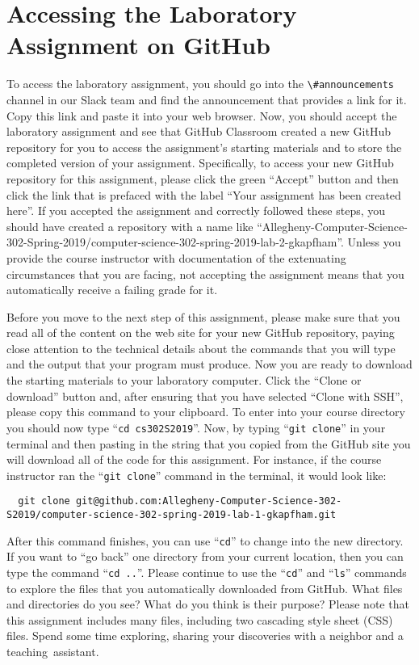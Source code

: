 \documentclass[11pt]{article}
\newcommand{\command}[1]{``\lstinline{#1}''}
\newcommand{\channel}[1]{\lstinline{#1}}
\newcommand{\step}[1]{``{#1}''}
\begin{document}
\section*{Accessing the Laboratory Assignment on GitHub}

To access the laboratory assignment, you should go into the
\channel{\#announcements} channel in our Slack team and find the announcement
that provides a link for it. Copy this link and paste it into your web browser.
Now, you should accept the laboratory assignment and see that GitHub Classroom
created a new GitHub repository for you to access the assignment's starting
materials and to store the completed version of your assignment. Specifically,
to access your new GitHub repository for this assignment, please click the green
``Accept'' button and then click the link that is prefaced with the label ``Your
assignment has been created here''. If you accepted the assignment and correctly
followed these steps, you should have created a repository with a name like
``Allegheny-Computer-Science-302-Spring-2019/computer-science-302-spring-2019-lab-2-gkapfham''.
Unless you provide the course instructor with documentation of the extenuating
circumstances that you are facing, not accepting the assignment means that you
automatically receive a failing grade for it.

Before you move to the next step of this assignment, please make sure that you
read all of the content on the web site for your new GitHub repository, paying
close attention to the technical details about the commands that you will type
and the output that your program must produce. Now you are ready to download the
starting materials to your laboratory computer. Click the ``Clone or download''
button and, after ensuring that you have selected ``Clone with SSH'', please
copy this command to your clipboard. To enter into your course directory you
should now type \command{cd cs302S2019}. Now, by typing \command{git clone} in
your terminal and then pasting in the string that you copied from the GitHub
site you will download all of the code for this assignment. For instance, if the
course instructor ran the \command{git clone} command in the terminal, it would
look like:

\begin{lstlisting}
  git clone git@github.com:Allegheny-Computer-Science-302-S2019/computer-science-302-spring-2019-lab-1-gkapfham.git
\end{lstlisting}

After this command finishes, you can use \command{cd} to change into the new
directory. If you want to \step{go back} one directory from your current
location, then you can type the command \command{cd ..}. Please continue to use
the \command{cd} and \command{ls} commands to explore the files that you
automatically downloaded from GitHub. What files and directories do you see?
What do you think is their purpose? Please note that this assignment includes
many files, including two cascading style sheet (CSS) files. Spend some time
exploring, sharing your discoveries with a neighbor and a \mbox{teaching
assistant}.
\end{document}
